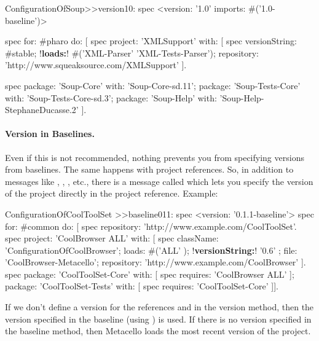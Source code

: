 \documentclass[a4paper,10pt,twoside]{book}
\begin{document}
\begin{code}{}
ConfigurationOfSoup>>version10: spec
	<version: '1.0' imports:  #('1.0-baseline')>

	spec for: #pharo do: [
		spec project: 'XMLSupport' with: [
                       spec
                          versionString: #stable;
                          !\textbf{loads:}! #('XML-Parser' 'XML-Tests-Parser');
                          repository: 'http://www.squeaksource.com/XMLSupport' ].

	spec
			package: 'Soup-Core' with: 'Soup-Core-sd.11';
			package: 'Soup-Tests-Core' with: 'Soup-Tests-Core-sd.3';
			package: 'Soup-Help' with: 'Soup-Help-StephaneDucasse.2' ].
\end{code}



\paragraph{Version in Baselines.} Even if this is not recommended, nothing prevents you from specifying versions from baselines. The same happens with project references. So, in addition to messages like , , , etc., there is a message called  which lets you specify the version of the project directly in the project reference. Example:

\begin{code}{}
ConfigurationOfCoolToolSet >>baseline011: spec
       <version: '0.1.1-baseline'>
       spec for: #common do: [
              spec repository: 'http://www.example.com/CoolToolSet'.
              spec project: 'CoolBrowser ALL' with: [
                            spec
                                   className: 'ConfigurationOfCoolBrowser';
                                   loads: #('ALL' );
                                   !\textbf{versionString:}! '0.6' ;
                                   file: 'CoolBrowser-Metacello';
                                   repository: 'http://www.example.com/CoolBrowser' ].
              spec
                     package: 'CoolToolSet-Core' with: [ spec requires: 'CoolBrowser ALL' ];
                     package: 'CoolToolSet-Tests' with: [ spec requires: 'CoolToolSet-Core' ]].
\end{code}

If we don't define a version for the references   and  in the version method, then the version specified in the baseline (using ) is used.  If there is no version specified in the baseline method, then Metacello loads the most recent version of the project.
\end{document}

